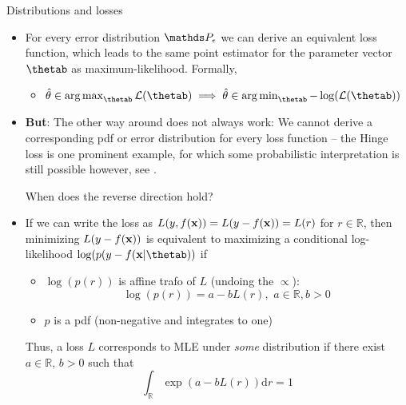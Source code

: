 \documentclass[11pt,compress,t,notes=noshow, xcolor=table]{beamer}
\begin{document}
\begin{vbframe}{Distributions and losses}

\begin{itemize} 
\item For every error distribution $\P_\eps$ we can derive an equivalent loss function, which leads to the same point estimator for the parameter vector $\thetab$ as maximum-likelihood. Formally,
\begin{itemize}
    \item $\thetah \in \argmax_{\thetab} \LL(\thetab) \implies \thetah \in \argmin_{\thetab}-\log(\LL(\thetab))$  %
\end{itemize}
\item \textbf{But}: The other way around does not always work: We cannot derive a corresponding pdf or error distribution for every loss function -- the Hinge loss is one prominent example, for which some probabilistic interpretation is still possible however, see .

\framebreak

When does the reverse direction hold?
\item If we can write the loss as $L(y,f(\mathbf{x}))=L(y-f(\mathbf{x}))=L(r)$ for $r \in \mathbb{R}$, then minimizing $L(y-f(\mathbf{x}))$ is equivalent to maximizing a conditional log-likelihood $\log(p(y-f(\xv|\thetab))$ if
\begin{itemize}
 \setlength{\itemsep}{1.2em}
    \item $\log(p(r))$ is affine trafo of $L$ (undoing the $\propto$):
    $$\log(p(r)) = a - bL(r),\,\,a \in \mathbb{R}, b>0$$
    \item  $p$ is a pdf (non-negative and integrates to one)
\end{itemize}
\lz
Thus, a loss $L$ corresponds to MLE under \textit{some} distribution if there exist $a \in \mathbb{R},\, b>0$ such that
$$ \int_{\mathbb{R}} \exp(a-bL(r))\text{d}r = 1$$
\end{itemize}
    
\end{vbframe}


\endlecture
\end{document}
